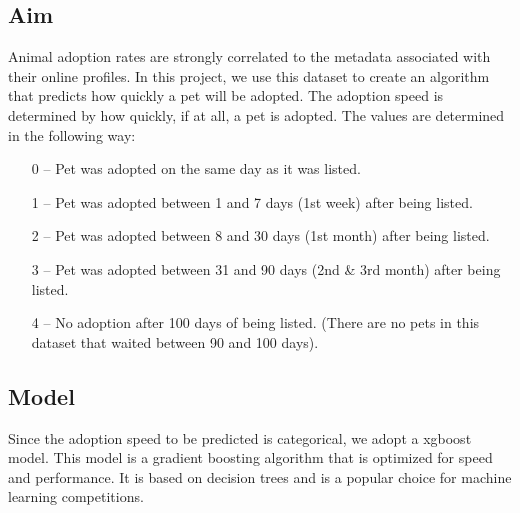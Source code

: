 \subsection{Aim}
Animal adoption rates are strongly correlated to the metadata associated with their online profiles. In this project, we use this dataset to create an algorithm that predicts how quickly a pet will be adopted. The adoption speed is determined by how quickly, if at all, a pet is adopted. The values are determined in the following way:
\begin{enumerate}
    \item[0 --]  Pet was adopted on the same day as it was listed.
    \item[1 --]  Pet was adopted between 1 and 7 days (1st week) after being listed.
    \item[2 --]  Pet was adopted between 8 and 30 days (1st month) after being listed.
    \item[3 --] Pet was adopted between 31 and 90 days (2nd \& 3rd month) after being listed.
    \item[4 --] No adoption after 100 days of being listed. (There are no pets in this dataset that waited between 90 and 100 days).
\end{enumerate}

\subsection{Model}
Since the adoption speed to be predicted is categorical, we adopt a xgboost model. This model is a gradient boosting algorithm that is optimized for speed and performance. It is based on decision trees and is a popular choice for machine learning competitions.

